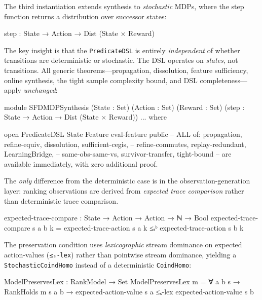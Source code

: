 \documentclass[9pt,a4paper]{article}
\theoremstyle{plain}
\theoremstyle{definition}
\theoremstyle{remark}
\begin{document}
The third instantiation extends synthesis to \emph{stochastic} MDPs, where the step function returns a distribution over successor states:

\begin{spec}
  step : State → Action → Dist (State × Reward)
\end{spec}

\noindent The key insight is that the \texttt{PredicateDSL} is entirely \emph{independent} of whether transitions are deterministic or stochastic.
The DSL operates on \emph{states}, not transitions.
All generic theorems---propagation, dissolution, feature sufficiency, online synthesis, the tight sample complexity bound, and DSL completeness---apply \emph{unchanged}:

\begin{spec}
module SFDMDPSynthesis (State : Set) (Action : Set) (Reward : Set)
  (step : State → Action → Dist (State × Reward)) ... where

  open PredicateDSL State Feature eval-feature public
  -- ALL of: propagation, refine-equiv, dissolution, sufficient-cegis,
  --         refine-commutes, replay-redundant, LearningBridge,
  --         same-obs-same-vs, survivor-transfer, tight-bound
  -- are available immediately, with zero additional proof.
\end{spec}

\noindent The \emph{only} difference from the deterministic case is in the observation-generation layer: ranking observations are derived from \emph{expected trace comparison} rather than deterministic trace comparison.

\begin{spec}
  expected-trace-compare : State → Action → Action → ℕ → Bool
  expected-trace-compare s a b k =
    expected-trace-action s a k ≤ₜᵇ expected-trace-action s b k
\end{spec}

\noindent The preservation condition uses \emph{lexicographic} stream dominance on expected action-values (\texttt{≤ₛ-lex}) rather than pointwise stream dominance, yielding a \texttt{StochasticCoindHomo} instead of a deterministic \texttt{CoindHomo}:

\begin{spec}
  ModelPreservesLex : RankModel → Set
  ModelPreservesLex m = ∀ a b s →
    RankHolds m s a b →
    expected-action-value s a ≤ₛ-lex expected-action-value s b
\end{spec}
\end{document}

